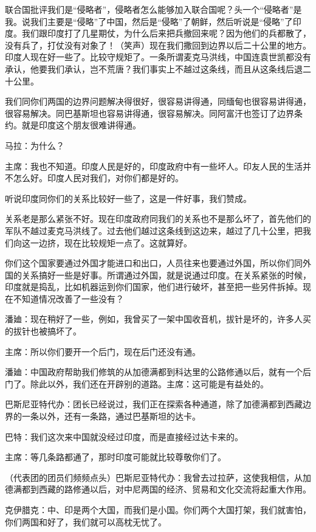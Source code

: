 联合国批评我们是“侵略者”，侵略者怎么能够加入联合国呢？头一个“侵略者”是我。说我们主要是“侵略”了中国，然后是“侵略”了朝鲜，然后听说是“侵略”了印度。我们跟印度打了几星期仗，为什么后来把兵撤回来呢？因为他们的兵都散了，没有兵了，打仗没有对象了！（笑声）现在我们撒回到边界以后二十公里的地方。印度人现在好一些了。比较守规矩了。一条所谓麦克马洪线，中国连袁世凯都没有承认，他要我们承认，岂不荒唐？我们事实上不越过这条线，而且从这条线后退二十公里。

我们同你们两国的边界问题解决得很好，很容易讲得通，同缅甸也很容易讲得通，很容易解决。同巴基斯坦也容易讲得通，很容易解决。同阿富汗也签订了边界条约。就是印度这个朋友很难讲得通。

马拉：为什么？

主席：我也不知道。印度人民是好的，印度政府中有一些坏人。印友人民的生活并不怎么好。印度人民对我们，对你们都是好的。

听说印度同你们的关系比较好一些了，这是一件好事，我们赞成。

关系老是那么紧张不好。现在印度政府同我们的关系也不是那么坏了，首先他们的军队不越过麦克马洪线了。过去他们越过这条线到这边来，越过了几十公里，把我们向这一边挤，现在比较规矩一点了。这就算好。

你们这个国家要通过外国才能进口和出口，人员往来也要通过外国，所以你们同外国的关系搞好一些是好事。所谓通过外国，就是说通过印度。在关系紧张的时候，印度就是捣乱，比如机器运到你们国家，他们进行破坏，甚至把一些另件拆掉。现在不知道情况改善了一些没有？

潘廸：现在稍好了一些，例如，我曾买了一架中国收音机，拔针是坏的，许多人买的拔针也被搞坏了。

主席：所以你们要开一个后门，现在后门还没有通。

潘廸：中国政府帮助我们修筑的从加德满都到科达里的公路修通以后，就有一个后门了。除此以外，我们还在开辟别的道路。主席：这可能是有益处的。

巴斯尼亚特代办：团长已经说过，我们正在探索各种通道，除了加德满都到西藏边界的一条以外，还有一条路，通过巴基斯坦的达卡。

巴特：我们这次来中国就没经过印度，而是直接经过达卡来的。

主席：等几条路都通了，那时印度可能就比较尊敬你们了。

（代表团的团员们频频点头）巴斯尼亚特代办：我曾去过拉萨，这使我相信，从加德满都到西藏的路修通以后，对中尼两国的经济、贸易和文化交流将起重大作用。

克伊腊克：中、印是两个大国，而我们是小国。你们两个大国打架，我们就害怕，你们两国和好了，我们就可以高枕无忧了。

